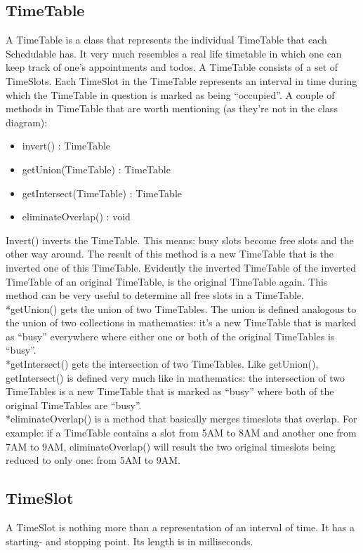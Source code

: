 \documentclass[12pt]{article}
\begin{document}
\subsection{TimeTable}
A TimeTable is a class that represents the individual TimeTable that each Schedulable has. It very much resembles a real life timetable in which one can keep track of one’s appointments and todos. A TimeTable consists of a set of TimeSlots. Each TimeSlot in the TimeTable represents an interval in time during which the TimeTable in question is marked as being “occupied”. A couple of methods in TimeTable that are worth mentioning (as they're not in the class diagram):
\begin{itemize}
\item{invert() : TimeTable}
\item{getUnion(TimeTable) : TimeTable}
\item{getIntersect(TimeTable) : TimeTable}
\item{eliminateOverlap() : void}
\end{itemize}
Invert() inverts the TimeTable. This means: busy slots become free slots and the other way around. The result of this method is a new TimeTable that is the inverted one of this TimeTable. Evidently the inverted TimeTable of the inverted TimeTable of an original TimeTable, is the original TimeTable again. This method can be very useful to determine all free slots in a  TimeTable. 
\\*getUnion() gets the union of two TimeTables. The union is defined analogous to the union of two collections in mathematics: it’s a new TimeTable that is marked as “busy” everywhere where either one or both of the original TimeTables is “busy”.
\\*getIntersect() gets the intersection of two TimeTables. Like getUnion(), getIntersect() is defined very much like in mathematics: the intersection of two TimeTables is a new TimeTable that is marked as “busy” where both of the original TimeTables are “busy”.
\\*eliminateOverlap() is a method that basically merges timeslots that overlap. For example: if a TimeTable contains a slot from 5AM to 8AM and another one from 7AM to 9AM, eliminateOverlap() will result the two original timeslots being reduced to only one: from 5AM to 9AM.

\subsection{TimeSlot}
A TimeSlot is nothing more than a representation of an interval of time. It has a starting- and stopping point. Its length is in milliseconds.
\end{document}
